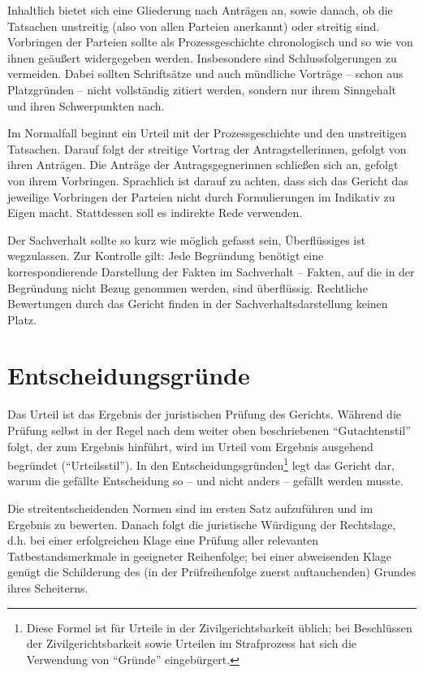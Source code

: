 Inhaltlich bietet sich eine Gliederung nach Anträgen an, sowie danach, ob die Tatsachen unstreitig (also von allen Parteien anerkannt) oder streitig sind. Vorbringen der Parteien sollte als Prozessgeschichte chronologisch und so wie von ihnen geäußert widergegeben werden. Insbesondere sind Schlussfolgerungen zu vermeiden. Dabei sollten Schriftsätze und auch mündliche Vorträge – schon aus Platzgründen – nicht vollständig zitiert werden, sondern nur ihrem Sinngehalt und ihren Schwerpunkten nach.

Im Normalfall beginnt ein Urteil mit der Prozessgeschichte und den unstreitigen Tatsachen. Darauf folgt der streitige Vortrag der Antragstellerinnen, gefolgt von ihren Anträgen. Die Anträge der Antragsgegnerinnen schließen sich an, gefolgt von ihrem Vorbringen. Sprachlich ist darauf zu achten, dass sich das Gericht das jeweilige Vorbringen der Parteien nicht durch Formulierungen im Indikativ zu Eigen macht. Stattdessen soll es indirekte Rede verwenden.

Der Sachverhalt sollte so kurz wie möglich gefasst sein, Überflüssiges ist wegzulassen. Zur Kontrolle gilt: Jede Begründung benötigt eine korrespondierende Darstellung der Fakten im Sachverhalt – Fakten, auf die in der Begründung nicht Bezug genommen werden, sind überflüssig. Rechtliche Bewertungen durch das Gericht finden in der Sachverhaltsdarstellung keinen Platz.

\section{Entscheidungsgründe}
Das Urteil ist das Ergebnis der juristischen Prüfung des Gerichts. Während die Prüfung selbst in der Regel nach dem weiter oben beschriebenen \enquote{Gutachtenstil} folgt, der zum Ergebnis hinführt, wird im Urteil vom Ergebnis ausgehend begründet (\enquote{Urteilsstil}). In den Entscheidungsgründen\footnote{Diese Formel ist für Urteile in der Zivilgerichtsbarkeit üblich; bei Beschlüssen der Zivilgerichtsbarkeit sowie Urteilen im Strafprozess hat sich die Verwendung von \enquote{Gründe} eingebürgert.} legt das Gericht dar, warum die gefällte Entscheidung so – und nicht anders – gefällt werden musste.

Die streitentscheidenden Normen sind im ersten Satz aufzuführen und im Ergebnis zu bewerten.%
Danach folgt die juristische Würdigung der Rechtslage, d.h. bei einer erfolgreichen Klage eine Prüfung aller relevanten Tatbestandsmerkmale in geeigneter Reihenfolge; bei einer abweisenden Klage genügt die Schilderung des (in der Prüfreihenfolge zuerst auftauchenden) Grundes ihres Scheiterns.

